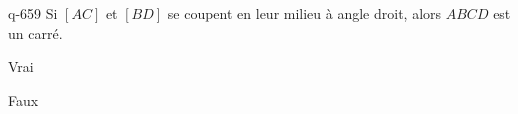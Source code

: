 \begin{truefalse}{q-659}
Si $[AC]$ et $[BD]$ se coupent en leur milieu à angle droit, alors $ABCD$ est un carré.
\item Vrai
\item* Faux
\end{truefalse}

